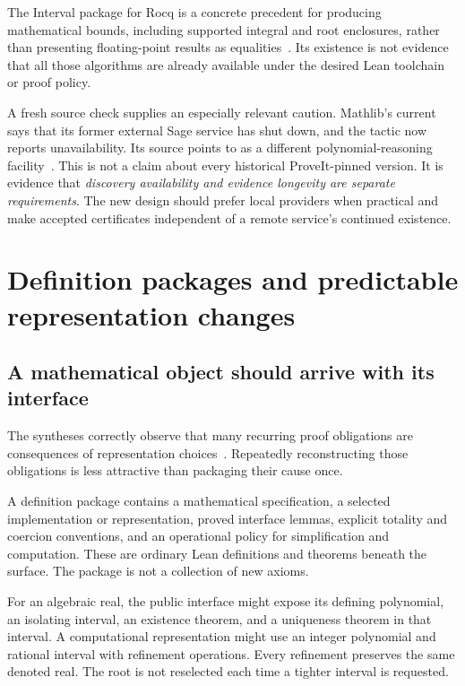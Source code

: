 \documentclass[11pt,a4paper]{article}
\newcommand{\code}[1]{\texttt{\detokenize{#1}}}
\theoremstyle{remark}\newtheorem{example}[proposition]{Example}
\begin{document}
The Interval package for Rocq is a concrete precedent for producing mathematical bounds, including supported integral and root enclosures, rather than presenting floating-point results as equalities~\cite{interval}. Its existence is not evidence that all those algorithms are already available under the desired Lean toolchain or proof policy.

A fresh source check supplies an especially relevant caution. Mathlib's current  says that its former external Sage service has shut down, and the tactic now reports unavailability. Its source points to \code{grobner} as a different polynomial-reasoning facility~\cite{polyrith}. This is not a claim about every historical ProveIt-pinned version. It is evidence that \emph{discovery availability and evidence longevity are separate requirements}. The new design should prefer local providers when practical and make accepted certificates independent of a remote service's continued existence.

\section{Definition packages and predictable representation changes}\label{sec:definitions}
\subsection{A mathematical object should arrive with its interface}
The syntheses correctly observe that many recurring proof obligations are consequences of representation choices~\cite{synthesis,blueprints}. Repeatedly reconstructing those obligations is less attractive than packaging their cause once.

A definition package contains a mathematical specification, a selected implementation or representation, proved interface lemmas, explicit totality and coercion conventions, and an operational policy for simplification and computation. These are ordinary Lean definitions and theorems beneath the surface. The package is not a collection of new axioms.

For an algebraic real, the public interface might expose its defining polynomial, an isolating interval, an existence theorem, and a uniqueness theorem in that interval. A computational representation might use an integer polynomial and rational interval with refinement operations. Every refinement preserves the same denoted real. The root is not reselected each time a tighter interval is requested.
\end{document}
